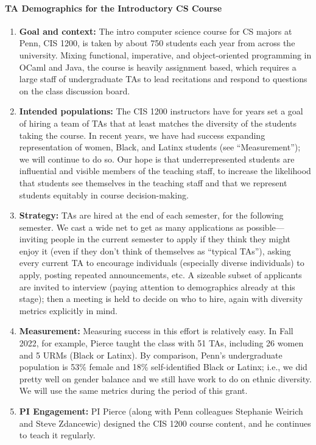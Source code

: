 \begin{enumerate}
\end{enumerate}


\paragraph*{TA Demographics for the Introductory CS Course}

\begin{enumerate}
\item {\bf Goal and context:} The intro computer science course for CS
majors at Penn, CIS 1200, is taken by about 750 students each year
from across the university.  Mixing functional, imperative, and
object-oriented programming in OCaml and Java, the course is heavily
assignment based, which requires a large staff of undergraduate TAs to
lead recitations and respond to questions on the class discussion
board.

\item {\bf Intended populations:} The CIS 1200 instructors have for years
set a goal of hiring a team of TAs that at least matches the diversity of the
students taking the course. In recent years, we have had success expanding
representation of women, Black, and Latinx students (see ``Measurement''); we
will continue to do so. Our hope is that underrepresented students are
influential and visible members of the teaching staff, to increase the
likelihood that students see themselves in the teaching staff and that we
represent students equitably in course decision-making.  

\item {\bf Strategy:} TAs are hired at the end of each semester, for
the following semester.  We cast a wide net to get as many
applications as possible---inviting people in the current semester to
apply if they think they might enjoy it (even if they don't think of
themselves as ``typical TAs''), asking every current TA to encourage
individuals (especially diverse individuals) to apply, posting
repeated announcements, etc.  A sizeable subset of applicants are
invited to interview (paying attention to demographics already at this
stage); then a meeting is held to decide on who to hire, again with
diversity metrics explicitly in mind.

\item {\bf Measurement:} Measuring success in this effort is
relatively easy.  In Fall 2022, for example, Pierce taught the class
with 51 TAs, including 26 women and 5 URMs (Black or Latinx).  By
comparison, Penn's undergraduate population is 53\% female and 18\%
self-identified Black or Latinx; i.e., we did pretty well on gender balance
and we still have work to do on ethnic diversity.  We will use the
same metrics during the period of this grant.

\item {\bf PI Engagement:} PI Pierce (along with Penn colleagues
Stephanie Weirich and Steve Zdancewic) designed the CIS 1200 course
content, and he continues to teach it regularly.
\end{enumerate}


